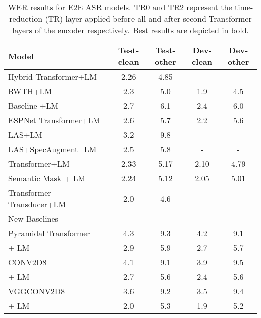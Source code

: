 \documentclass{article}
\begin{document}
\begin{table*}[ht]
\caption{WER results for E2E ASR models. TR0 and TR2 represent the time-reduction (TR) layer applied before all and after second Transformer layers of the encoder respectively. Best results are depicted in bold.}
\label{tab:results}
\vskip 0.15in
\begin{center}
\begin{small}
\begin{sc}
\begin{tabular}{lcccc}
\toprule
    Model       &Test-clean&Test-other&Dev-clean&Dev-other \\
\midrule
    Hybrid Transformer+LM~\citep{wang2020b} &2.26&4.85&-&- \\
    RWTH+LM~\citep{rwth}&2.3&5.0&1.9&4.5\\
    Baseline +LM ~\citep{moritz2020} &2.7  &6.1   &2.4  &6.0\\
    ESPNet Transformer+LM~\citep{karita2019asru}& 2.6  &5.7   & 2.2 &5.6\\
    LAS+LM~\citep{specaugment}&3.2&9.8&-&-\\
    LAS+SpecAugment+LM~\citep{specaugment} &2.5 &5.8 &- &- \\
    Transformer+LM~\citep{e2e2020}&2.33&5.17&2.10&4.79 \\
Semantic Mask + LM ~\citep{wang2020a}&2.24 &5.12 &2.05 &5.01 \\
    Transformer Transducer+LM~\citep{transducer}&2.0&4.6&-&- \\
    \hline
        New Baselines &&&& \\ \hline
Pyramidal Transformer  & 4.3 &9.3  &4.2 &9.1 \\ 
     \hspace{0.5cm}  + LM &2.9 &5.9 &2.7 &5.7 \\
    CONV2D8  & 4.1&9.1 & 3.9&9.5\\
     \hspace{0.5cm}  + LM &2.7 &5.6 &2.4 &5.6 \\
    VGGCONV2D8   &3.6 & 9.2  & 3.5 & 9.4\\
     \hspace{0.5cm}  + LM & 2.0& 5.3&1.9 &5.2 \\


\end{tabular}
\end{sc}
\end{small}
\end{center}
\end{table*}
\end{document}
